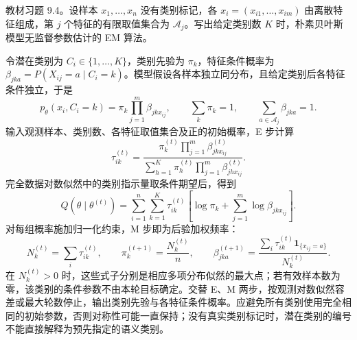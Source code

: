 \begin{example}
\label{ex:lihang-em-naive-bayes}
教材习题 9.4。设样本 $x_1,\ldots,x_n$ 没有类别标记，各 $x_i=(x_{i1},\ldots,x_{im})$ 由离散特征组成，第 $j$ 个特征的有限取值集合为 $\mathcal A_j$。写出给定类别数 $K$ 时，朴素贝叶斯模型无监督参数估计的 EM 算法。
\end{example}

\begin{solve}
令潜在类别为 $C_i\in\{1,\ldots,K\}$，类别先验为 $\pi_k$，特征条件概率为 $\beta_{jka}=P(X_{ij}=a\mid C_i=k)$。模型假设各样本独立同分布，且给定类别后各特征条件独立，于是
\[
  p_\theta(x_i,C_i=k)=\pi_k\prod_{j=1}^m\beta_{jkx_{ij}},\qquad
  \sum_k\pi_k=1,\qquad \sum_{a\in\mathcal A_j}\beta_{jka}=1.
\]
输入观测样本、类别数、各特征取值集合及正的初始概率，E 步计算
\[
  \tau_{ik}^{(t)}
  =\frac{\pi_k^{(t)}\prod_{j=1}^m\beta_{jkx_{ij}}^{(t)}}
  {\sum_{h=1}^K\pi_h^{(t)}\prod_{j=1}^m\beta_{jhx_{ij}}^{(t)}}.
\]
完全数据对数似然中的类别指示量取条件期望后，得到
\[
  Q(\theta\mid\theta^{(t)})
  =\sum_{i=1}^n\sum_{k=1}^K\tau_{ik}^{(t)}
  \left[\log\pi_k+\sum_{j=1}^m\log\beta_{jkx_{ij}}\right].
\]
对每组概率施加归一化约束，M 步即为后验加权频率：
\[
  N_k^{(t)}=\sum_i\tau_{ik}^{(t)},\qquad
  \pi_k^{(t+1)}=\frac{N_k^{(t)}}n,\qquad
  \beta_{jka}^{(t+1)}
  =\frac{\sum_i\tau_{ik}^{(t)}\mathbf1_{\{x_{ij}=a\}}}{N_k^{(t)}}.
\]
在 $N_k^{(t)}>0$ 时，这些式子分别是相应多项分布似然的最大点；若有效样本数为零，该类别的条件参数不由本轮目标确定。交替 E、M 两步，按观测对数似然容差或最大轮数停止，输出类别先验与各特征条件概率。应避免所有类别使用完全相同的初始参数，否则对称性可能一直保持；没有真实类别标记时，潜在类别的编号不能直接解释为预先指定的语义类别。
\end{solve}





